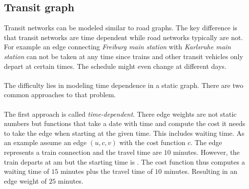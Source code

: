 \subsection{Transit graph}
	Transit networks can be modeled similar to road graphs. The key difference is that transit networks are time dependent
	while road networks typically are not. For example an edge connecting \textit{Freiburg main station} with \textit{Karlsruhe main station}
	can not be taken at any time since trains and other transit vehicles only depart at certain times. The schedule might even change
	at different days.\\\\
	The difficulty lies in modeling time dependence in a static graph. There are two common approaches to that problem.\\\\
	The first approach is called \textit{time-dependent}. There edge weights are not static numbers but functions that take a
	date with time and compute the cost it needs to take the edge when starting at the given time.
	This includes waiting time. As an example assume an edge $(u, c, v)$ with the cost function $c$. The edge represents a
	train connection and the travel time are $10$ minutes. However, the train departs at  am but the starting time
	is . The cost function thus computes a waiting time of $15$ minutes plus the travel time of $10$ minutes.
	Resulting in an edge weight of $25$ minutes.
	
